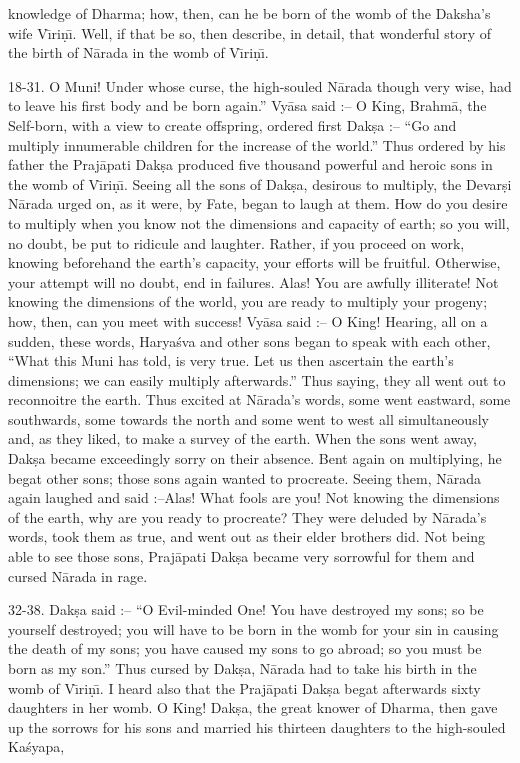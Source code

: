 knowledge of Dharma; how, then, can he be born of the womb of the Daksha's wife V\={\i}ri\d{n}\={\i}. Well, if that be so, then describe, in detail, that wonderful story of the birth of N\=arada in the womb of V\={\i}ri\d{n}\={\i}.

18-31. O Muni! Under whose curse, the high-souled N\=arada though very wise, had to leave his first body and be born again.'' Vy\=asa said :-- O King, Brahm\=a, the Self-born, with a view to create offspring, ordered first Dak\d{s}a :-- ``Go and multiply innumerable children for the increase of the world.'' Thus ordered by his father the Praj\=apati Dak\d{s}a produced five thousand powerful and heroic sons in the womb of V\={\i}ri\d{n}\={\i}. Seeing all the sons of Dak\d{s}a, desirous to multiply, the Devar\d{s}i N\=arada urged on, as it were, by Fate, began to laugh at them. How do you desire to multiply when you know not the dimensions and capacity of earth; so you will, no doubt, be put to ridicule and laughter. Rather, if you proceed on work, knowing beforehand the earth's capacity, your efforts will be fruitful. Otherwise, your attempt will no doubt, end in failures. Alas! You are awfully illiterate! Not knowing the dimensions of the world, you are ready to multiply your progeny; how, then, can you meet with success! Vy\=asa said :-- O King! Hearing, all on a sudden, these words, Harya\'sva and other sons began to speak with each other, ``What this Muni has told, is very true. Let us then ascertain the earth's dimensions; we can easily multiply afterwards.'' Thus saying, they all went out to reconnoitre the earth. Thus excited at N\=arada's words, some went eastward, some southwards, some towards the north and some went to west all simultaneously and, as they liked, to make a survey of the earth. When the sons went away, Dak\d{s}a became exceedingly sorry on their absence. Bent again on multiplying, he begat other sons; those sons again wanted to procreate. Seeing them, N\=arada again laughed and said :--Alas! What fools are you! Not knowing the dimensions of the earth, why are you ready to procreate? They were deluded by N\=arada's words, took them as true, and went out as their elder brothers did. Not being able to see those sons, Praj\=apati Dak\d{s}a became very sorrowful for them and cursed N\=arada in rage.

32-38. Dak\d{s}a said :-- ``O Evil-minded One! You have destroyed my sons; so be yourself destroyed; you will have to be born in the womb for your sin in causing the death of my sons; you have caused my sons to go abroad; so you must be born as my son.'' Thus cursed by Dak\d{s}a, N\=arada had to take his birth in the womb of V\={\i}ri\d{n}\={\i}. I heard also that the Praj\=apati Dak\d{s}a begat afterwards sixty daughters in her womb. O King! Dak\d{s}a, the great knower of Dharma, then gave up the sorrows for his sons and married his thirteen daughters to the high-souled Ka\'syapa,

